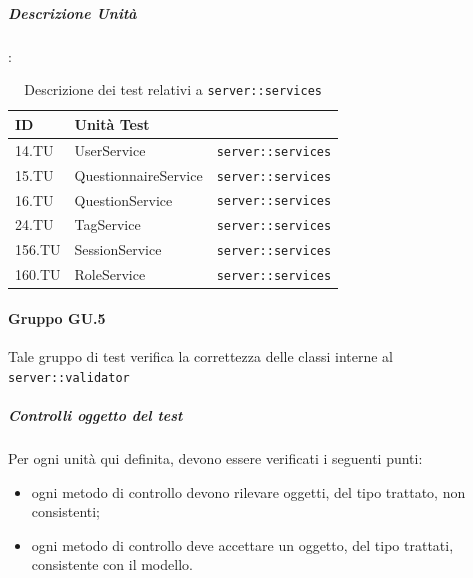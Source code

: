 \documentclass[12pt,a4paper]{article}
\begin{document}
\subparagraph{Descrizione Unità}:

\begin{table}[H]
	\begin{center}
		\begin{tabular}{p{} p{} p{}}
			\toprule
			\textbf{ID}   & \textbf{Unità Test}	& \textbf{\mgls{package}} \\ \midrule
			\midrule
			14.TU & UserService & \texttt{server::services}\\ \midrule
			15.TU & QuestionnaireService & \texttt{server::services}\\ \midrule
			16.TU & QuestionService & \texttt{server::services}\\ \midrule
			24.TU & TagService & \texttt{server::services}\\ \midrule
			156.TU & SessionService & \texttt{server::services}\\ \midrule
			160.TU & RoleService & \texttt{server::services}\\ \midrule			
			\bottomrule
		\end{tabular}
	\end{center}
	\caption{Descrizione dei test relativi a \texttt{server::services}}
\end{table}

\paragraph{Gruppo GU.5}
Tale gruppo di test verifica la correttezza delle classi interne al  \texttt{server::validator}

\subparagraph{Controlli oggetto del test}
Per ogni unità  qui definita, devono essere verificati i seguenti punti:

\begin{itemize}
	\item ogni metodo di controllo devono rilevare oggetti, del tipo trattato, non consistenti;
	\item ogni metodo di controllo deve accettare un oggetto, del tipo trattati, consistente con il modello.
\end{itemize}
\end{document}
